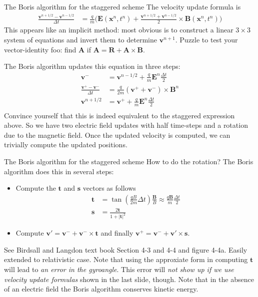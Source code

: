 \documentclass[pdf]{beamer}
\newcommand{\mvec}[1]{\mathbf{#1}}
\theoremstyle{definition}
\begin{document}
\begin{frame}{The Boris algorithm for the staggered scheme}
  \footnotesize%
  The velocity update formula is
  \begin{align*}
    \frac{\mvec{v}^{n+1/2}-\mvec{v}^{n-1/2}}{\Delta t} &= \frac{q}{m}
      \big(
        \mvec{E}(\mvec{x}^n,t^n) +
        \frac{\mvec{v}^{n+1/2}+\mvec{v}^{n-1/2}}{2}\times\mvec{B}(\mvec{x}^n,t^n)
      \big)
  \end{align*}
  This appears like an implicit method: most obvious is to construct a
  linear $3\times 3$ system of equations and invert them to determine
  $\mvec{v}^{n+1}$. Puzzle to test your vector-identity foo: find
  $\mvec{A}$ if $\mvec{A} = \mvec{R}+\mvec{A}\times\mvec{B}$.

  The Boris algorithm updates this equation in three steps:
  \begin{align*}
    \mvec{v}^- &= \mvec{v}^{n-1/2} + \frac{q}{m}\mvec{E}^n\frac{\Delta t}{2} \\
    \frac{\mvec{v}^+- \mvec{v}^-}{\Delta t}
    &=
      \frac{q}{2 m}(\mvec{v}^++\mvec{v}^-)\times\mvec{B}^n \\
    \mvec{v}^{n+1/2}
    &=
      \mvec{v}^{+} + \frac{q}{m}\mvec{E}^n\frac{\Delta t}{2} \\    
  \end{align*}
  Convince yourself that this is indeed equivalent to the staggered
  expression above. So we have two electric field updates with half
  time-steps and a rotation due to the magnetic field. Once the
  updated velocity is computed, we can trivially compute the updated
  positions.
\end{frame}

\begin{frame}{The Boris algorithm for the staggered scheme}
  \small%
  How to do the rotation? The Boris algorithm does this in several
  steps:
  \begin{itemize}
  \item Compute the $\mvec{t}$ and $\mvec{s}$ vectors as follows
    \begin{align*}
      \mvec{t} &= \tan\left( \frac{qB}{2m}\Delta t \right) \frac{\mvec{B}}{B}
                 \approx \frac{q\mvec{B}}{m}\frac{\Delta t}{2} \\
      \mvec{s} &= \frac{2\mvec{t}}{1+|\mvec{t}|^2}
    \end{align*}
  \item Compute $\mvec{v}' = \mvec{v}^- + \mvec{v}^-\times\mvec{t}$
    and finally $\mvec{v}^+ = \mvec{v}^-+\mvec{v}'\times\mvec{s}$.
  \end{itemize}
  See Birdsall and Langdon text book Section 4-3 and 4-4 and figure
  4-4a. Easily extended to relativistic case. Note that using the
  approxiate form in computing $\mvec{t}$ will lead to \emph{an error
    in the gyroangle}. This error will \emph{not show up if we use
    velocity update formulas} shown in the last slide, though. %
  \vskip0.1in%
  Note that in the absence of an electric field the Boris algorithm
  conserves kinetic energy.
\end{frame}
\end{document}
